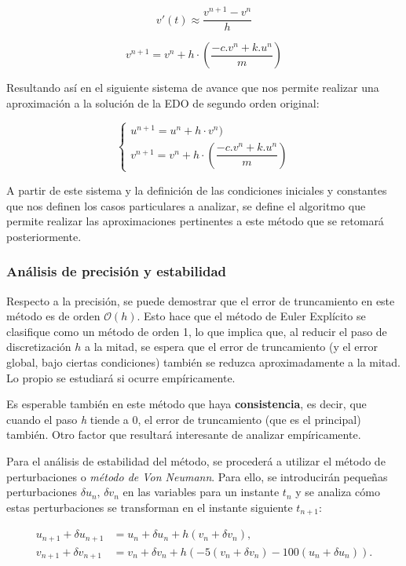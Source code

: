 \documentclass[titlepage,a4paper]{article}
\begin{document}
\[
v'(t) \approx \dfrac{v^{n+1} - v^n}{h} 
\]

\[
v^{n+1} = v^n + h \cdot \left(\dfrac{-c.v^n + k.u^n}{m}\right)
\]

Resultando así en el siguiente sistema de avance que nos permite realizar una aproximación a la solución de la EDO de segundo orden original:

\[
\begin{cases}
u^{n+1} = u^n + h \cdot v^n) \\
v^{n+1} = v^n + h \cdot \left(\dfrac{-c.v^n + k.u^n}{m}\right)
\end{cases}
\]

A partir de este sistema y la definición de las condiciones iniciales y constantes que nos definen los casos particulares a analizar, se define el algoritmo que permite realizar las aproximaciones pertinentes a este método que se retomará posteriormente.

\subsubsection{Análisis de precisión y estabilidad}

    Respecto a la precisión, se puede demostrar que el error de truncamiento en este método es de orden $\mathcal{O}(h)$. Esto hace que el método de Euler Explícito se clasifique como un método de orden 1, lo que implica que, al reducir el paso de discretización $h$ a la mitad, se espera que el error de truncamiento (y el error global, bajo ciertas condiciones) también se reduzca aproximadamente a la mitad. Lo propio se estudiará si ocurre empíricamente.

    Es esperable también en este método que haya \textbf{consistencia}, es decir, que cuando el paso \textit{h} tiende a 0, el error de truncamiento (que es el principal) también. Otro factor que resultará interesante de analizar empíricamente.

    Para el análisis de estabilidad del método, se procederá a utilizar el método de perturbaciones o \textit{método de Von Neumann}. Para ello, se introducirán pequeñas perturbaciones \(\delta u_n,\, \delta v_n\) en las variables para un instante $t_n$ y se analiza cómo estas perturbaciones se transforman en el instante siguiente $t_{n+1}$:
    
    \begin{align*}
        u_{n+1} + \delta u_{n+1} &= u_n + \delta u_n + h (v_n + \delta v_n), \\
        v_{n+1} + \delta v_{n+1} &= v_n + \delta v_n + h (-5 (v_n + \delta v_n) - 100 (u_n + \delta u_n)).
    \end{align*}
\end{document}
